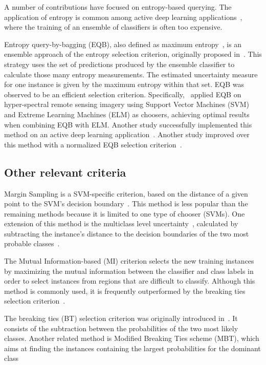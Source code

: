 \documentclass[remotesensing,article,submit,moreauthors,pdftex]{Definitions/mdpi}
\begin{document}
A number of contributions have focused on entropy-based querying. The
application of entropy is common among active deep learning
applications~\cite{Aghdam2019}, where the training of an ensemble of
classifiers is often too expensive. 

Entropy query-by-bagging (EQB), also defined as maximum
entropy~\cite{Liu2020}, is an ensemble approach of the entropy selection
criterion, originally proposed in~\cite{Tuia2009}. This strategy uses the set
of predictions produced by the ensemble classifier to calculate those many
entropy measurements. The estimated uncertainty measure for one instance is
given by the maximum entropy within that set. EQB was observed to be an
efficient selection criterion. Specifically,~\cite{Shrivastava2021} applied
EQB on hyper-spectral remote sensing imagery using Support Vector Machines
(SVM) and Extreme Learning Machines (ELM) as choosers, achieving optimal
results when combining EQB with ELM\@. Another study successfully implemented
this method on an active deep learning application~\cite{Liu2020}. Another
study improved over this method with a normalized EQB selection
criterion~\cite{Copa2010}.

\subsection{Other relevant criteria}

Margin Sampling is a SVM-specific criterion, based on the distance of a given
point to the SVM's decision boundary~\cite{Shrivastava2021}. This method is
less popular than the remaining methods because it is limited to one type of
chooser (SVMs). One extension of this method is the multiclass level
uncertainty~\cite{Shrivastava2021}, calculated by subtracting the instance's
distance to the decision boundaries of the two most probable
classes~\cite{Demir2011}.

The Mutual Information-based (MI) criterion selects the new training instances
by maximizing the mutual information between the classifier and class labels
in order to select instances from regions that are difficult to classify.
Although this method is commonly used, it is frequently outperformed by the
breaking ties selection criterion~\cite{Li2011,Liu2018}.

The breaking ties (BT) selection criterion was originally introduced
in~\cite{Luo2003}. It consists of the subtraction between the probabilities of
the two most likely classes. Another related method is Modified Breaking Ties
scheme (MBT), which aims at finding the instances containing the largest
probabilities for the dominant class~\cite{Liu2018,Li2013a}
\end{document}

